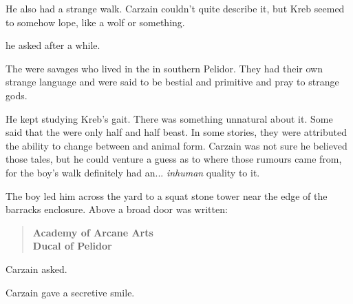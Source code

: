 He also had a strange walk. 
Carzain couldn't quite describe it, but Kreb seemed to somehow lope, like a wolf or something. 

 he asked after a while. 


The \Goydens{} were savages who lived in the \Wylde{} in southern Pelidor. 
They had their own strange language and were said to be bestial and primitive and pray to strange gods. 

He kept studying Kreb's gait. 
There was something unnatural about it. 
Some said that the \Goydens{} were only half \human{} and half beast. 
In some stories, they were attributed the ability to change between \human{} and animal form. 
Carzain was not sure he believed those tales, but he could venture a guess as to where those rumours came from, for the boy's walk definitely had an... \emph{inhuman} quality to it.%



\begin{comment}
\subsubsection{Archibald Curwen}
\end{comment}

The boy led him across the yard to a squat stone tower near the edge of the barracks enclosure. 
Above a broad door was written: 

\begin{quote}
\begin{center}
{\bf 
  Academy of Arcane Arts\\
  Ducal \Ishrah{} of Pelidor
}
\end{center}
\end{quote}

 Carzain asked. 


Carzain gave a secretive smile. 

